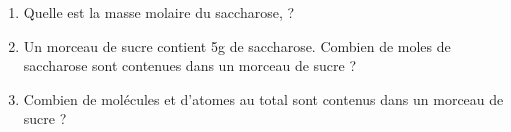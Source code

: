 \documentclass[
  11pt,
  a4paper,
  openany]{book}
\begin{document}
\newpage

\begin{Exercise}

\begin{enumerate}
\def\labelenumi{\arabic{enumi}.}
\item
  Quelle est la masse molaire du saccharose,  ?
\item
  Un morceau de sucre contient 5g de saccharose. Combien de moles de saccharose sont contenues dans un morceau de sucre ?
\item
  Combien de molécules et d'atomes au total sont contenus dans un morceau de sucre ?
\end{enumerate}

\end{Exercise}
\end{document}
